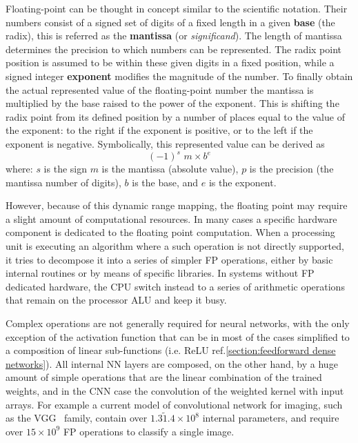 Floating-point can be thought in concept similar to the scientific notation. Their numbers consist of a signed set of digits of a fixed length in a given \textbf{base} (the radix), this is referred as the \textbf{mantissa} (or \textit{significand}). The length of mantissa determines the precision to which numbers can be represented. The radix point position is assumed to be within these given digits in a fixed position, while a signed integer \textbf{exponent} modifies the magnitude of the number.
To finally obtain the actual represented value of the floating-point number the mantissa is multiplied by the base raised to the power of the exponent. This is shifting the radix point from its defined position by a number of places equal to the value of the exponent: to the right if the exponent is positive, or to the left if the exponent is negative.
Symbolically, this represented value can be derived as 
%
$$ (-1)^s \,\, m \times b^e $$
%
where: $s$ is the sign $m$ is the mantissa (absolute value), $p$ is the precision (the mantissa number of digits), $b$ is the base, and $e$ is the exponent.


However, because of this dynamic range mapping, the floating point may require a slight amount of computational resources.
In many cases a specific hardware component is dedicated to the floating point computation. When a processing unit is executing an algorithm where a such operation is not directly supported, it tries to decompose it into a series of simpler \acs{FP} operations, either by basic internal routines or by means of specific libraries.
In systems without \acs{FP} dedicated hardware, the CPU switch instead to a series of arithmetic operations that remain on the processor \ac{ALU} and keep it busy.

Complex operations are not generally required for neural networks, with the only exception of the activation function that can be in most of the cases simplified to a composition of linear sub-functions (i.e. ReLU ref.\cref{section:feedforward dense networks}). All internal NN layers are composed, on the other hand, by a huge amount of simple operations that are the linear combination of the trained weights, and in the \acs{CNN} case the convolution of the weighted kernel with input arrays.
For example a current model of convolutional network for imaging, such as the VGG~\cite{Simonyan15} family, contain over
$1.3\tilde1.4\times10^8$ internal parameters, and require over $15\times10^9$ \acs{FP} operations to classify a single image.

